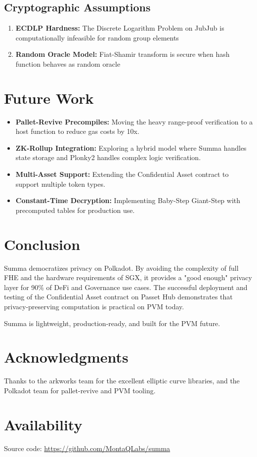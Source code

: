 \documentclass[11pt,a4paper]{article}
\begin{document}
\subsection{Cryptographic Assumptions}
\begin{enumerate}
    \item \textbf{ECDLP Hardness:} The Discrete Logarithm Problem on JubJub is computationally infeasible for random group elements
    \item \textbf{Random Oracle Model:} Fiat-Shamir transform is secure when hash function behaves as random oracle
\end{enumerate}

\section{Future Work}
\begin{itemize}
    \item \textbf{Pallet-Revive Precompiles:} Moving the heavy range-proof verification to a host function to reduce gas costs by 10x.
    \item \textbf{ZK-Rollup Integration:} Exploring a hybrid model where Summa handles state storage and Plonky2 handles complex logic verification.
    \item \textbf{Multi-Asset Support:} Extending the Confidential Asset contract to support multiple token types.
    \item \textbf{Constant-Time Decryption:} Implementing Baby-Step Giant-Step with precomputed tables for production use.
\end{itemize}

\section{Conclusion}
Summa democratizes privacy on Polkadot. By avoiding the complexity of full FHE and the hardware requirements of SGX, it provides a "good enough" privacy layer for 90\% of DeFi and Governance use cases. The successful deployment and testing of the Confidential Asset contract on Passet Hub demonstrates that privacy-preserving computation is practical on PVM today.

Summa is lightweight, production-ready, and built for the PVM future.

\section*{Acknowledgments}
Thanks to the arkworks team for the excellent elliptic curve libraries, and the Polkadot team for pallet-revive and PVM tooling.

\section*{Availability}
Source code: \url{https://github.com/MontaQLabs/summa}
\end{document}
